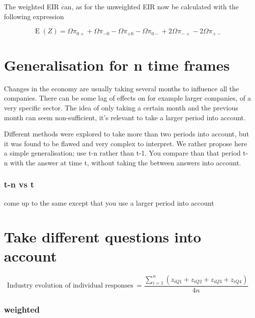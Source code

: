 \documentclass[12pt,a4paper,oneside]{book}
\DeclareMathOperator{\E}{E}
\begin{document}
The weighted EIR can, as for the unweighted EIR now be calculated with the following expression 

\begin{equation}
    \E(Z) = \Omega \pi_{0+} + \Omega \pi_{-0} - \Omega \pi_{+0} - \Omega \pi_{0-} +2\Omega \pi_{-+} -2\Omega \pi_{+-} 
\end{equation}


\section{Generalisation for n time frames}

Changes in the economy are usually taking several months to influence all the companies. There can be some lag of effects on for example larger companies, of a very specific sector.
The idea of only taking a certain month and the previous month can seem non-sufficient, it's relevant to take a larger period into account. 

Different methods were explored to take more than two periods into account, but it was found to be flawed and very complex to interpret.
We rather propose here a simple generalisation; use t-n rather than t-1. You compare than that period t-n with the answer at time t, without taking the between answers into account.

\subsubsection{t-n vs t}

come up to the same except that you use a larger period into account



\section{Take different questions into account}


\begin{equation}
    \mbox{Industry evolution of individual responses}\ = \frac{\sum_{i=1}^n \left(z_{i Q1} + z_{i Q2} + z_{i Q3} + z_{i Q4} \right)}{4n}
\end{equation}





\subsubsection{weighted}
\end{document}
